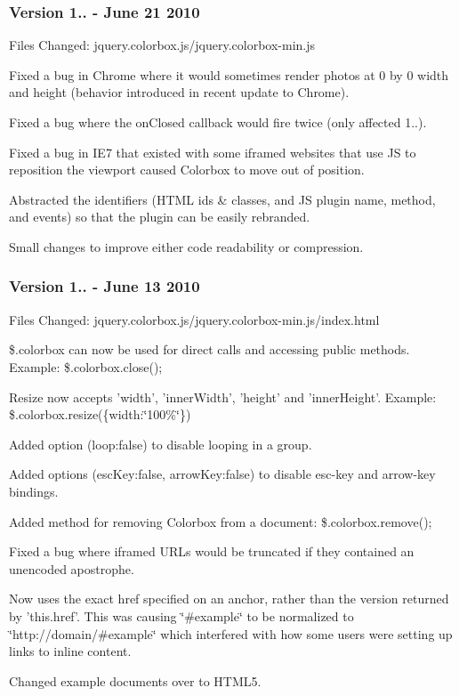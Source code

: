 \subsubsection*{Version 1.. -\/ June 21 2010}

Files Changed\-: jquery.\-colorbox.\-js/jquery.colorbox-\/min.\-js


\begin{DoxyItemize}
\item Fixed a bug in Chrome where it would sometimes render photos at 0 by 0 width and height (behavior introduced in recent update to Chrome).
\item Fixed a bug where the on\-Closed callback would fire twice (only affected 1..).
\item Fixed a bug in I\-E7 that existed with some iframed websites that use J\-S to reposition the viewport caused Colorbox to move out of position.
\item Abstracted the identifiers (H\-T\-M\-L ids \& classes, and J\-S plugin name, method, and events) so that the plugin can be easily rebranded.
\item Small changes to improve either code readability or compression.
\end{DoxyItemize}

\subsubsection*{Version 1.. -\/ June 13 2010}

Files Changed\-: jquery.\-colorbox.\-js/jquery.colorbox-\/min.\-js/index.html


\begin{DoxyItemize}
\item \$.colorbox can now be used for direct calls and accessing public methods. Example\-: \$.colorbox.\-close();
\item Resize now accepts 'width', 'inner\-Width', 'height' and 'inner\-Height'. Example\-: \$.colorbox.\-resize(\{width\-:\char`\"{}100\%\char`\"{}\})
\item Added option (loop\-:false) to disable looping in a group.
\item Added options (esc\-Key\-:false, arrow\-Key\-:false) to disable esc-\/key and arrow-\/key bindings.
\item Added method for removing Colorbox from a document\-: \$.colorbox.\-remove();
\item Fixed a bug where iframed U\-R\-Ls would be truncated if they contained an unencoded apostrophe.
\item Now uses the exact href specified on an anchor, rather than the version returned by 'this.\-href'. This was causing \char`\"{}\#example\char`\"{} to be normalized to \char`\"{}http\-://domain/\#example\char`\"{} which interfered with how some users were setting up links to inline content.
\item Changed example documents over to H\-T\-M\-L5.
\end{DoxyItemize}

